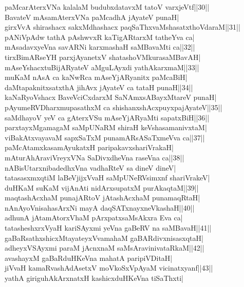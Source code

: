 \documentclass{article}
\begin{document}
paMcarAterxVNa kalalaM budubxdatavxM tatoV varxjeVtf||30||\\
BavateV mAsamAterxVNa paMcadhA jAyateV punaH|\\
girxVvA shirashacx sakxMdhashacx paqSaThxvaMshasatxthoVdaraM||31||\\
pANiVpAdw tathA pAshwvxR kaTigARtarxM tatheYva ca|\\
mAsadavxyeVna savARNi karxmashaH saMBavaMti ca||32||\\
tirxBimARseYH parxjAyanetxV shatashoVMkurasaMBavAH|\\
mAseYshacxtuBijARyateV aMguLAyxdi yathAkarxmaM||33||\\
muKaM nAsA ca kaNwRca mAseYjARyanitx paMcaBiH|\\
daMtapaknitxsatxthA jihAvx jAyateV ca tataH punaH||34||\\
kaNaRyoVshacx BaveVciCxdarxM SaNAmxsABayxMtareV punaH|\\
pAyumeRVDharxmupasathxM ca shishanxshAcxpuyxpajAyateV||35||\\
saMdhayoV yeV ca gAterxVSu mAseYjARyaMti sapatxBiH||36||\\
parxtayxMgamagaM saMpUNaRM shiraH keVshasamanivxtaM|\\
viBakAtxvayavaM sapxSaTxM punamARsASaTxmeVva ca||37||\\
paMcAtamxkasamAyukatxH paripakavxshariVrakaH|\\
mAturAhAraviVreyxVNa SaDivxdheVna raseVna ca||38||\\
nABisUtarxnibadedhxVna vadhaRteV sa dineV dineV|\\
tatasasxmxqtiM laBeVjijxVvaH saMpUNeRVsimxnf shariVrakeV|\\
duHKaM suKaM vijAnAti nidArxsupatxM purAkaqtaM||39||\\
maqtashAcxhaM punajARtoV jAtashAcxhaM punamaqRtaH|\\
nAnAyoVnisahasArxNi mayA daqSATxnayxneVkashaH||40||\\
adhunA jAtamAtorxVhaM pArxpatxsaMsAkxra Eva ca|\\
tatasheshxrxVyaH kariSAyxmi yeVna gaBeRV na saMBavaH||41||\\
gaBaRsathxshicxMtayateyxVvamahaM gaBARdivxnisasxqtaH|\\
adheyxVSAyxmi paraM jAcnxnaM saMsAravinivataRkaM||42||\\
avashayxM gaBaRduHKeVna mahatA paripiVDitaH|\\
jiVvaH kamaRvashAdAsetxV moVkoSxVpAyaM vicinatxyanf||43||\\
yathA giriguhAkArxnatxH kashicxduHKeVna tiSaThxti|\\
\end{document}
